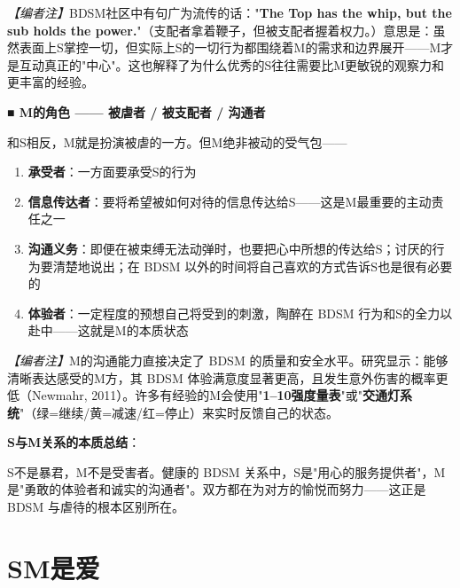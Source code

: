 \documentclass[12pt,UTF8]{ctexbook}
\begin{document}
\textit{【编者注】}BDSM社区中有句广为流传的话："\textbf{The Top has the whip, but the sub holds the power.}"（支配者拿着鞭子，但被支配者握着权力。）意思是：虽然表面上S掌控一切，但实际上S的一切行为都围绕着M的需求和边界展开——M才是互动真正的"中心"。这也解释了为什么优秀的S往往需要比M更敏锐的观察力和更丰富的经验。

\noindent\textbf{■ M的角色 —— 被虐者 / 被支配者 / 沟通者}

和S相反，M就是扮演被虐的一方。但M绝非被动的受气包——

\begin{enumerate}
	\item \textbf{承受者}：一方面要承受S的行为
	\item \textbf{信息传达者}：要将希望被如何对待的信息传达给S——这是M最重要的主动责任之一
	\item \textbf{沟通义务}：即便在被束缚无法动弹时，也要把心中所想的传达给S；讨厌的行为要清楚地说出；在 BDSM 以外的时间将自己喜欢的方式告诉S也是很有必要的
	\item \textbf{体验者}：一定程度的预想自己将受到的刺激，陶醉在 BDSM 行为和S的全力以赴中——这就是M的本质状态
\end{enumerate}

\textit{【编者注】}M的沟通能力直接决定了 BDSM 的质量和安全水平。研究显示：能够清晰表达感受的M方，其 BDSM 体验满意度显著更高，且发生意外伤害的概率更低（Newmahr, 2011）。许多有经验的M会使用"\textbf{1--10强度量表}"或"\textbf{交通灯系统}"（绿=继续/黄=减速/红=停止）来实时反馈自己的状态。

\noindent\textbf{S与M关系的本质总结}：

\begin{center}
\end{center}

\begin{tcolorbox}[colback=pink!5!white,colframe=red!50!black,title=贴心小叮咛]
S不是暴君，M不是受害者。健康的 BDSM 关系中，S是"用心的服务提供者"，M是"勇敢的体验者和诚实的沟通者"。双方都在为对方的愉悦而努力——这正是 BDSM 与虐待的根本区别所在。
\end{tcolorbox}

\section{SM是爱}
\end{document}
